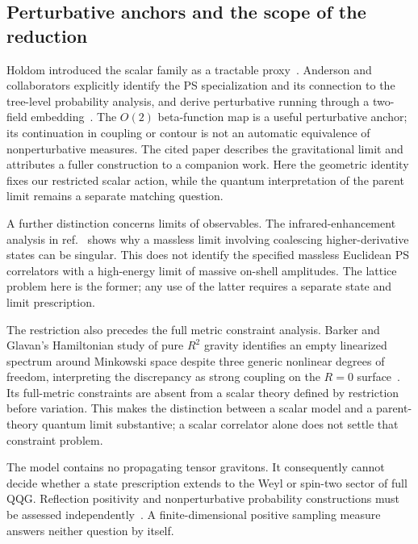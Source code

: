\subsection{Perturbative anchors and the scope of the reduction}

Holdom introduced the scalar family as a tractable proxy~\cite{Holdom:2023,Holdom:2024}.  Anderson and collaborators explicitly identify the PS specialization and its connection to the tree-level probability analysis, and derive perturbative running through a two-field embedding~\cite{Anderson:2026,Bateman:2026}.  The $O(2)$ beta-function map is a useful perturbative anchor; its continuation in coupling or contour is not an automatic equivalence of nonperturbative measures.  The cited paper describes the gravitational limit and attributes a fuller construction to a companion work.  Here the geometric identity fixes our restricted scalar action, while the quantum interpretation of the parent limit remains a separate matching question.

A further distinction concerns limits of observables.  The infrared-enhancement analysis in ref.~\cite{SalvioStrumiaVitti:2026} shows why a massless limit involving coalescing higher-derivative states can be singular.  This does not identify the specified massless Euclidean PS correlators with a high-energy limit of massive on-shell amplitudes.  The lattice problem here is the former; any use of the latter requires a separate state and limit prescription.

The restriction also precedes the full metric constraint analysis.  Barker and Glavan's Hamiltonian study of pure $R^2$ gravity identifies an empty linearized spectrum around Minkowski space despite three generic nonlinear degrees of freedom, interpreting the discrepancy as strong coupling on the $R=0$ surface~\cite{BarkerGlavan:2026}.  Its full-metric constraints are absent from a scalar theory defined by restriction before variation.  This makes the distinction between a scalar model and a parent-theory quantum limit substantive; a scalar correlator alone does not settle that constraint problem.

The model contains no propagating tensor gravitons.  It consequently cannot decide whether a state prescription extends to the Weyl or spin-two sector of full QQG.  Reflection positivity and nonperturbative probability constructions must be assessed independently~\cite{Arici:2018,Salvio:2024}.  A finite-dimensional positive sampling measure answers neither question by itself.

